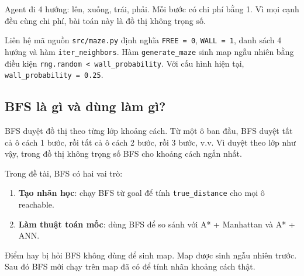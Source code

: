 \documentclass[12pt,a4paper]{article}
\newcommand{\code}[1]{\texttt{#1}}
\newcommand{\term}[1]{\textbf{#1}}
\begin{document}
Agent đi 4 hướng: lên, xuống, trái, phải. Mỗi bước có chi phí bằng 1. Vì mọi cạnh đều cùng chi phí, bài toán này là đồ thị không trọng số.

\begin{teachbox}{Liên hệ mã nguồn}
\code{src/maze.py} định nghĩa \code{FREE = 0}, \code{WALL = 1}, danh sách 4 hướng và hàm \code{iter\_neighbors}. Hàm \code{generate\_maze} sinh map ngẫu nhiên bằng điều kiện \code{rng.random < wall\_probability}. Với cấu hình hiện tại, \code{wall\_probability = 0.25}.
\end{teachbox}

\subsection{BFS là gì và dùng làm gì?}

BFS duyệt đồ thị theo từng lớp khoảng cách. Từ một ô ban đầu, BFS duyệt tất cả ô cách 1 bước, rồi tất cả ô cách 2 bước, rồi 3 bước, v.v. Vì duyệt theo lớp như vậy, trong đồ thị không trọng số BFS cho khoảng cách ngắn nhất.

\begin{center}
\end{center}

Trong đề tài, BFS có hai vai trò:

\begin{enumerate}
    \item \term{Tạo nhãn học}: chạy BFS từ goal để tính \code{true\_distance} cho mọi ô reachable.
    \item \term{Làm thuật toán mốc}: dùng BFS để so sánh với A* + Manhattan và A* + ANN.
\end{enumerate}

\begin{warnbox}{Điểm hay bị hỏi}
BFS không dùng để sinh map. Map được sinh ngẫu nhiên trước. Sau đó BFS mới chạy trên map đã có để tính nhãn khoảng cách thật.
\end{warnbox}
\end{document}
